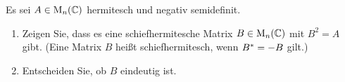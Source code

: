 \documentclass[a4paper, 10pt]{scrartcl}
\begin{document}










\begin{question}[subtitle = Wurzeln aus negativ semidefiniten Matrizen]
  Es sei $A \in \operatorname{M}_{n}(\mathbb{C})$ hermitesch und negativ semidefinit.
  \begin{enumerate}
    \item
      Zeigen Sie, dass es eine schiefhermitesche Matrix $B \in \operatorname{M}_{n}(\mathbb{C})$ mit $B^2 = A$ gibt.
      (Eine Matrix $B$ heißt schiefhermitesch, wenn $B^* = -B$ gilt.)
    \item
      Entscheiden Sie, ob $B$ eindeutig ist.
  \end{enumerate}
\end{question}
\end{document}
